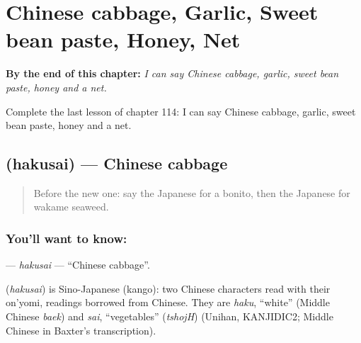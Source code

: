 
\chapter{Chinese cabbage, Garlic, Sweet bean paste, Honey, Net}
\label{ch:ja-chinese-cabbage-garlic-sweet-bean-paste-honey-net}

\begin{chapteropening}
\textbf{By the end of this chapter:} \emph{I can say Chinese cabbage, garlic, sweet bean paste, honey and a net.}

Complete the last lesson of chapter 114: I can say Chinese cabbage, garlic, sweet bean paste, honey and a net.
\end{chapteropening}

\section[\texorpdfstring{\ja{はくさい} (hakusai)}{はくさい (hakusai)}]{ (hakusai) — Chinese cabbage}

\label{lesson:JA-C114-hakusai}



\begin{quote}
Before the new one: say the Japanese for a bonito, then the Japanese for wakame seaweed.
\end{quote}

\subsection*{You'll want to know: }
\textbf{} — \emph{hakusai} — \textquotedblleft{}Chinese cabbage\textquotedblright{}.

\begin{cousinweb}
\textbf{} (\emph{hakusai}) is Sino-Japanese (kango): two Chinese characters read with their on'yomi, readings borrowed from Chinese. They are \emph{haku}, \textquotedblleft{}white\textquotedblright{} (Middle Chinese \emph{baek}) and \emph{sai}, \textquotedblleft{}vegetables\textquotedblright{} (\emph{tshojH}) (Unihan, KANJIDIC2; Middle Chinese in Baxter's transcription).
\end{cousinweb}

